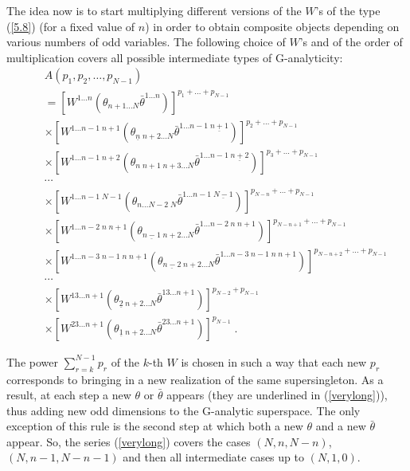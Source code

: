 \documentclass[a4paper,12pt]{article}
\begin{document}
The idea now is to start multiplying different versions of the 
$W$'s of the type (\ref{5.8}) (for a fixed value of $n$) in order 
to obtain composite objects depending on various numbers of odd 
variables. The following choice of $W$'s and of the order of 
multiplication covers all possible intermediate types of 
G-analyticity: 
\begin{eqnarray}
  &&A(p_1,p_2,\ldots,p_{N-1})\nonumber\\
  && = [W^{1\ldots n}(\theta_{n+1 \ldots  N} 
\bar\theta^{1  \ldots  n})]^{p_1 + \ldots +p_{N-1}}\nonumber\\ 
  &&\times [W^{1\ldots n-1\; 
n+1}(\theta_{\underline{n}\;{n+2} \ldots  N} \bar\theta^{1\ldots 
n-1\; \underline{n+1}}) ]^{p_2 + \ldots +p_{N-1}}\nonumber\\ 
  &&\times [W^{1\ldots n-1\; 
n+2}(\theta_{n\;  {n+1}\; {n+3} \ldots N}  \bar\theta^{1\ldots 
n-1\; \underline{n+2}} ) ]^{p_3 + \ldots +p_{N-1}}\nonumber\\ 
  && \cdots     \nonumber\\ 
  &&\times [W^{1\ldots n-1\; 
N-1}(\theta_{n \ldots {N-2} \; N} \bar\theta^{1\ldots n-1\; 
\underline{N-1}})]^{p_{N-n} + \ldots +p_{N-1}}\nonumber\\ 
  &&\times [W^{1\ldots n-2\; n\; n+1}(\theta_{\underline{n-1}\; {n+2} 
\ldots  N} \bar\theta^{1\ldots n-2\; n\; n+1})]^{p_{N-n+1} + 
\ldots +p_{N-1}}\nonumber\\ 
  &&\times [W^{1\ldots n-3\; n-1\; n\; n+1}(\theta_{\underline{n-2}\; n+2
 \ldots N} 
\bar\theta^{1\ldots n-3\; n-1\; n\; n+1}) ]^{p_{N-n+2} + \ldots 
+p_{N-1}}\nonumber\\ 
  && \cdots     \nonumber\\ 
  &&\times [W^{13\ldots n+1}(\theta_{\underline{2}\; n+2 
 \ldots N} 
\bar\theta^{13\ldots n+1}) ]^{p_{N-2}+p_{N-1}} \nonumber\\  
  &&\times [W^{23\ldots n+1}(\theta_{\underline{1}\; {n+2} \ldots  N} 
\bar\theta^{23\ldots n+1}) ]^{p_{N-1}} \;.         
\label{verylong} 
\end{eqnarray}

The power $\sum^{N-1}_{r=k} p_r$ of the $k$-th $W$ is chosen in 
such a way that each new $p_r$ corresponds to bringing in a new 
realization of the same supersingleton. As a result, at each step 
a new $\theta$ or $\bar\theta$ appears (they are underlined in 
(\ref{verylong})), thus adding new odd dimensions to the 
G-analytic superspace. The only exception of this rule is the 
second step at which both a new $\theta$ and a new $\bar\theta$ 
appear. So, the series (\ref{verylong}) covers the cases 
$(N,n,N-n)$, $(N,n-1,N-n-1)$ and  then all intermediate cases up 
to $(N,1,0)$. 
\end{document}
